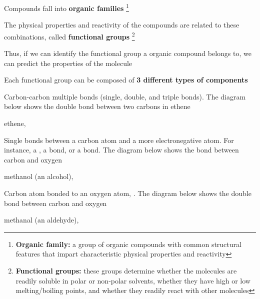 \begin{bulleted-list}
    \item Compounds fall into \textbf{organic families}
        \footnote{
            \textbf{Organic family:} a group of organic compounds with common structural features
            that impart characteristic physical properties and reactivity
        }
    \item The physical properties and reactivity of the compounds are related to these combinations,
        called \textbf{functional groups}
        \footnote{
            \textbf{Functional groups:} these groups determine whether the molecules are readily
            soluble in polar or non-polar solvents, whether they have high or low melting/boiling
            points, and whether they readily react with other molecules
        }
    \item Thus, if we can identify the functional group a organic compound belongs to, we can predict
        the properties of the molecule
\end{bulleted-list}
Each functional group can be composed of \textbf{3 different types of components}
\begin{enum}
    \item Carbon-carbon multiple bonds (single, double, and triple bonds). The diagram below
        shows the double bond between two carbons in ethene
        \begin{center}
            ethene, 

        \end{center}
    \item Single bonds between a carbon atom and a more electronegative atom. For instance, a
        , a  bond, or a  bond. The diagram below shows the bond between
        carbon and oxygen
        \begin{center}
            methanol (an alcohol), 

        \end{center}
    \item Carbon atom bonded to an oxygen atom, . The diagram below shows the double 
        bond between carbon and oxygen
        \begin{center}
            methanal (an aldehyde), 
            
        \end{center}
\end{enum}

